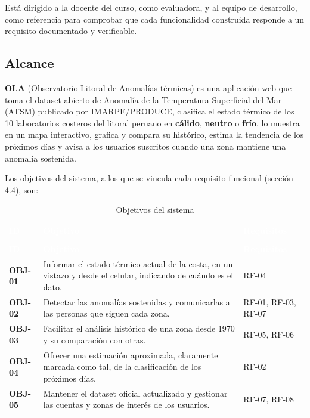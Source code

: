 \documentclass[11pt,a4paper,oneside]{article}
\begin{document}
Está dirigido a la docente del curso, como evaluadora, y al equipo de desarrollo, como referencia para comprobar que cada funcionalidad construida responde a un requisito documentado y verificable.



\subsection{Alcance}

\textbf{OLA} (Observatorio Litoral de Anomalías térmicas) es una aplicación web que toma el dataset abierto de Anomalía de la Temperatura Superficial del Mar (ATSM) publicado por IMARPE/PRODUCE, clasifica el estado térmico de los 10 laboratorios costeros del litoral peruano en \textbf{cálido}, \textbf{neutro} o \textbf{frío}, lo muestra en un mapa interactivo, grafica y compara su histórico, estima la tendencia de los próximos días y avisa a los usuarios suscritos cuando una zona mantiene una anomalía sostenida.



Los objetivos del sistema, a los que se vincula cada requisito funcional (sección 4.4), son:



{\small
\begin{xltabular}{\textwidth}{@{}>{\sffamily\bfseries}p{1.5cm}Y>{\raggedright\arraybackslash}p{3cm}@{}}
\caption{Objetivos del sistema}\label{tab:obj}\\
\textcolor{white}{\sffamily\bfseries\footnotesize ID} & \textcolor{white}{\sffamily\bfseries\footnotesize Objetivo} & \textcolor{white}{\sffamily\bfseries\footnotesize Requisitos}\\
\endfirsthead
{}\\
\textcolor{white}{\sffamily\bfseries\footnotesize ID} & \textcolor{white}{\sffamily\bfseries\footnotesize Objetivo} & \textcolor{white}{\sffamily\bfseries\footnotesize Requisitos}\\
\endhead
OBJ-01 & Informar el estado térmico actual de la costa, en un vistazo y desde el celular, indicando de cuándo es el dato. & RF-04\\ \hline
{}OBJ-02 & Detectar las anomalías sostenidas y comunicarlas a las personas que siguen cada zona. & RF-01, RF-03, RF-07\\ \hline
OBJ-03 & Facilitar el análisis histórico de una zona desde 1970 y su comparación con otras. & RF-05, RF-06\\ \hline
{}OBJ-04 & Ofrecer una estimación aproximada, claramente marcada como tal, de la clasificación de los próximos días. & RF-02\\ \hline
OBJ-05 & Mantener el dataset oficial actualizado y gestionar las cuentas y zonas de interés de los usuarios. & RF-07, RF-08\\ \hline
\end{xltabular}}
\vspace{0.6em}
\end{document}
